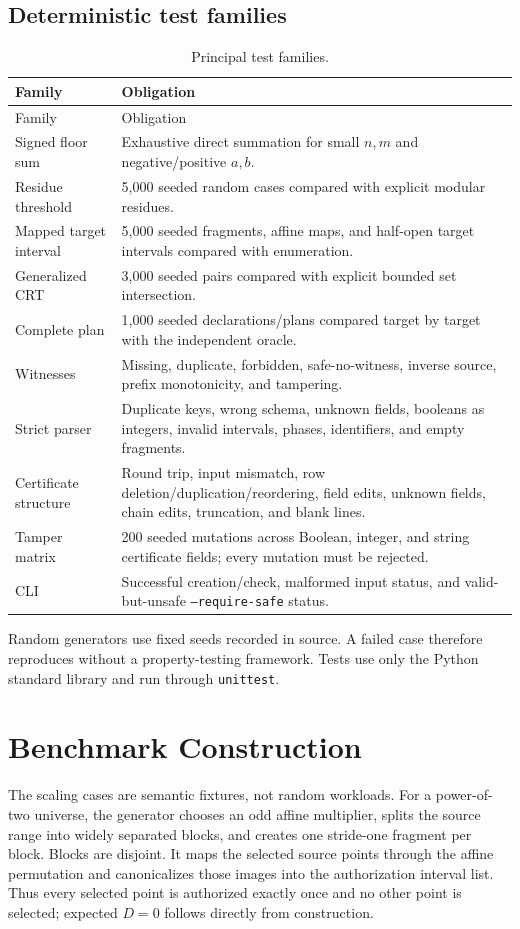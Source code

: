 \documentclass[11pt,onecolumn]{IEEEtran}
\newcommand{\code}[1]{\texttt{#1}}
\begin{document}
\subsection{Deterministic test families}
\begin{longtable}{@{}p{}p{}@{}}
\caption{Principal test families.}\label{tab:tests}\\
\toprule
Family & Obligation \\
\midrule
\endfirsthead
\toprule
Family & Obligation \\
\midrule
\endhead
Signed floor sum & Exhaustive direct summation for small $n,m$ and negative/positive $a,b$. \\
Residue threshold & 5,000 seeded random cases compared with explicit modular residues. \\
Mapped target interval & 5,000 seeded fragments, affine maps, and half-open target intervals compared with enumeration. \\
Generalized CRT & 3,000 seeded pairs compared with explicit bounded set intersection. \\
Complete plan & 1,000 seeded declarations/plans compared target by target with the independent oracle. \\
Witnesses & Missing, duplicate, forbidden, safe-no-witness, inverse source, prefix monotonicity, and tampering. \\
Strict parser & Duplicate keys, wrong schema, unknown fields, booleans as integers, invalid intervals, phases, identifiers, and empty fragments. \\
Certificate structure & Round trip, input mismatch, row deletion/duplication/reordering, field edits, unknown fields, chain edits, truncation, and blank lines. \\
Tamper matrix & 200 seeded mutations across Boolean, integer, and string certificate fields; every mutation must be rejected. \\
CLI & Successful creation/check, malformed input status, and valid-but-unsafe \code{--require-safe} status. \\
\bottomrule
\end{longtable}

Random generators use fixed seeds recorded in source.  A failed case therefore reproduces without a property-testing framework.  Tests use only the Python standard library and run through \code{unittest}.

\section{Benchmark Construction}
The scaling cases are semantic fixtures, not random workloads.  For a power-of-two universe, the generator chooses an odd affine multiplier, splits the source range into widely separated blocks, and creates one stride-one fragment per block.  Blocks are disjoint.  It maps the selected source points through the affine permutation and canonicalizes those images into the authorization interval list.  Thus every selected point is authorized exactly once and no other point is selected; expected $D=0$ follows directly from construction.
\end{document}

